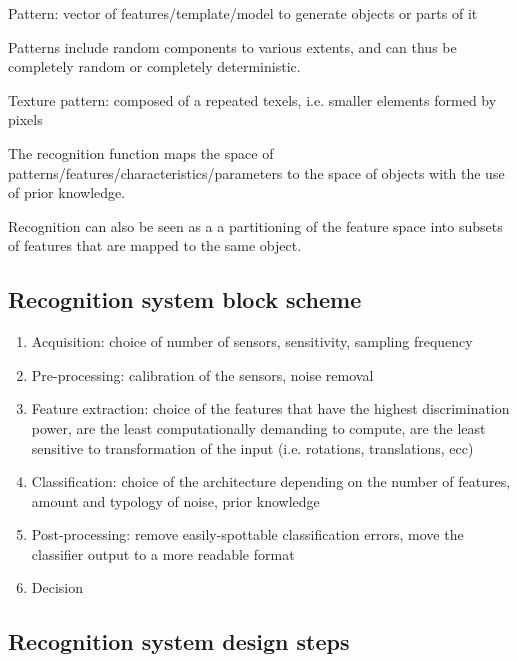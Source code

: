 \documentclass[oneside,onecolumn]{report}
\begin{document}
Pattern: vector of features/template/model to generate objects or parts of it

Patterns include random components to various extents, and can thus be completely random or completely deterministic.

Texture pattern: composed of a repeated texels, i.e. smaller elements formed by pixels

The recognition function maps the space of patterns/features/characteristics/parameters to the space of objects with the use of prior knowledge.

Recognition can also be seen as a a partitioning of the feature space into subsets of features that are mapped to the same object.


\subsection{Recognition system block scheme}

\begin{enumerate}
    \item Acquisition: choice of number of sensors, sensitivity, sampling frequency
    \item Pre-processing: calibration of the sensors, noise removal
    \item Feature extraction: choice of the features that have the highest discrimination power, are the least computationally demanding to compute, are the least sensitive to transformation of the input (i.e. rotations, translations, ecc)
    \item Classification: choice of the architecture depending on the number of features, amount and typology of noise, prior knowledge
    \item Post-processing: remove easily-spottable classification errors, move the classifier output to a more readable format
    \item Decision
\end{enumerate}


\subsection{Recognition system design steps}
\end{document}
